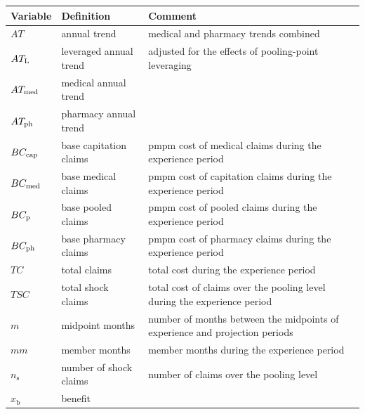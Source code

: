 \documentclass[letterpaper]{article} %
\begin{document}
\begin{table}
 \small
 \begin{tabular}{|l|p{3cm}|p{3cm}|} 
 \hline 
 \textbf{Variable} & \textbf{Definition} & \textbf{Comment}\\ [0.5ex] 
\hline
 
 $AT$ & annual trend & medical and pharmacy trends combined \\ 
 
 $AT_{\rm L}$ & leveraged annual trend &  adjusted for the effects of pooling-point leveraging \\ 
 
 $AT_{\rm med}$ & medical annual trend & \\

 $AT_{\rm ph}$  & pharmacy annual trend  &\\

 $BC_{\rm cap}$ &  base capitation claims & pmpm cost of medical claims during the experience period\\ 

 $BC_{\rm med}$ &  base medical claims & pmpm cost of capitation claims during the experience period\\ 

 $BC_{\rm p}$ &  base pooled claims &  pmpm cost of pooled claims during the experience period\\ 

 $BC_{\rm ph}$ & base pharmacy claims & pmpm cost of pharmacy claims during the experience period\\ 

 $TC$ &  total claims & total cost during the experience period \\
 
 $TSC$ &  total shock claims & total cost of claims over the pooling level during the experience period \\
 
 $m$ & midpoint months & number of months between the midpoints of experience and projection periods  \\ 

 $mm$ &  member months & member months during the experience period\\
 
 $n_\text{s}$ &  number of shock claims & number of claims over the pooling level\\
$x_\text{b}$ &  benefit & \\ 


\end{tabular}
\end{table}
\end{document}
